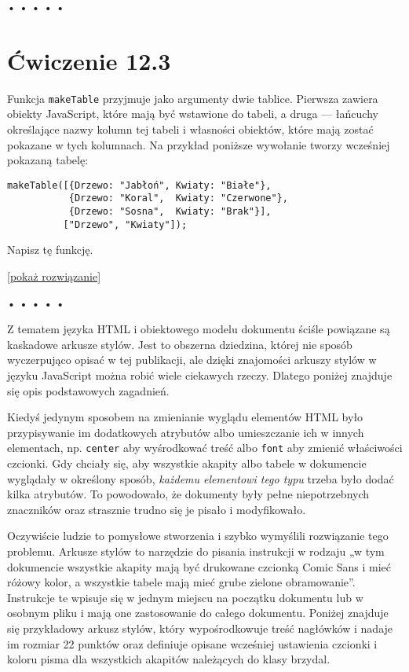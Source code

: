 \begin{center}
• • • • •
\end{center}

  
\section*{Ćwiczenie 12.3}
\label{sec:12.3}
  
    
Funkcja \texttt{makeTable} przyjmuje jako argumenty dwie tablice. Pierwsza zawiera obiekty JavaScript, które mają być wstawione do tabeli, a druga — łańcuchy określające nazwy kolumn tej tabeli i własności obiektów, które mają zostać pokazane w tych kolumnach. Na przykład poniższe wywołanie tworzy wcześniej pokazaną tabelę:

    
\begin{verbatim} 
makeTable([{Drzewo: "Jabłoń", Kwiaty: "Białe"},
           {Drzewo: "Koral",  Kwiaty: "Czerwone"},
           {Drzewo: "Sosna",  Kwiaty: "Brak"}],
          ["Drzewo", "Kwiaty"]);
 \end{verbatim}
    
Napisz tę funkcję.

  
[\hyperref[sol:12.3]{pokaż rozwiązanie}]


\begin{center}
• • • • •
\end{center}

  
Z tematem języka HTML i obiektowego modelu dokumentu ściśle powiązane są kaskadowe arkusze stylów. Jest to obszerna dziedzina, której nie sposób wyczerpująco opisać w tej publikacji, ale dzięki znajomości arkuszy stylów w języku JavaScript można robić wiele ciekawych rzeczy. Dlatego poniżej znajduje się opis podstawowych zagadnień.

  
Kiedyś jedynym sposobem na zmienianie wyglądu elementów HTML było przypisywanie im dodatkowych atrybutów albo umieszczanie ich w innych elementach, np. \texttt{center} aby wyśrodkować treść albo \texttt{font} aby zmienić właściwości czcionki. Gdy chciały się, aby wszystkie akapity albo tabele w dokumencie wyglądały w określony sposób, \emph{każdemu elementowi tego typu} trzeba było dodać kilka atrybutów. To powodowało, że dokumenty były pełne niepotrzebnych znaczników oraz strasznie trudno się je pisało i modyfikowało.

  
Oczywiście ludzie to pomysłowe stworzenia i szybko wymyślili rozwiązanie tego problemu. Arkusze stylów to narzędzie do pisania instrukcji w rodzaju „w tym dokumencie wszystkie akapity mają być drukowane czcionką Comic Sans i mieć różowy kolor, a wszystkie tabele mają mieć grube zielone obramowanie”. Instrukcje te wpisuje się w jednym miejscu na początku dokumentu lub w osobnym pliku i mają one zastosowanie do całego dokumentu. Poniżej znajduje się przykładowy arkusz stylów, który wypośrodkowuje treść nagłówków i nadaje im rozmiar 22 punktów oraz definiuje opisane wcześniej ustawienia czcionki i koloru pisma dla wszystkich akapitów należących do klasy brzydal.

